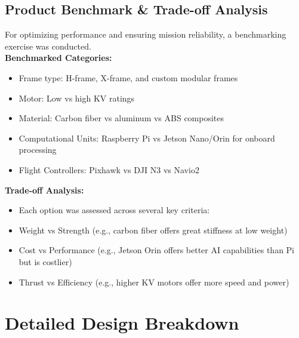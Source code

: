 \documentclass[12pt]{report}
\begin{document}
    \section{Product Benchmark \& Trade-off Analysis} %
    For optimizing performance and ensuring mission reliability, a benchmarking exercise was conducted. \\

\textbf{Benchmarked Categories:}
\begin{itemize}
  \item Frame type: H-frame, X-frame, and custom modular frames
\item Motor: Low vs high KV ratings
  \item Material: Carbon fiber vs aluminum vs ABS composites
  \item Computational Units: Raspberry Pi vs Jetson Nano/Orin for onboard processing
  \item Flight Controllers: Pixhawk vs DJI N3 vs Navio2
  
\end{itemize}

  \textbf{Trade-off Analysis:}
\begin{itemize}
  \item Each option was assessed across several key criteria:
  \item Weight vs Strength (e.g., carbon fiber offers great stiffness at low weight)
  \item Cost vs Performance (e.g., Jetson Orin offers better AI capabilities than Pi but is costlier)
  \item Thrust vs Efficiency (e.g., higher KV motors offer more speed and power)
\end{itemize}
                               
  \chapter{Detailed Design Breakdown}                                 
\end{document}
